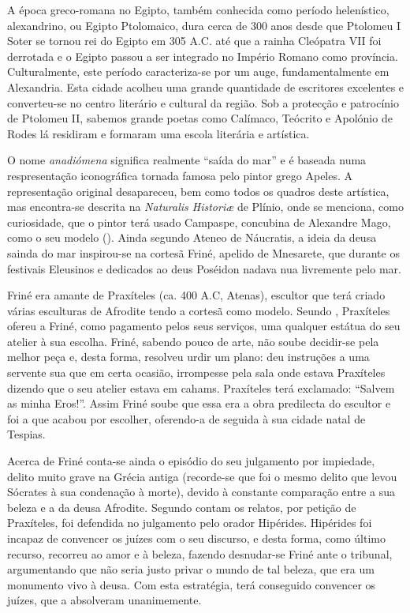 \documentclass{article}
\begin{document}
A época greco-romana no Egipto, também conhecida como período
helenístico, alexandrino, ou Egipto Ptolomaico, dura cerca de 300 anos
desde que Ptolomeu I Soter se tornou rei do Egipto em 305 A.C. até que
a rainha Cleópatra VII foi derrotada e o Egipto passou a ser integrado
no Império Romano como província. Culturalmente, este período
caracteriza-se por um auge, fundamentalmente em Alexandria. Esta
cidade acolheu uma grande quantidade de escritores excelentes e
converteu-se no centro literário e cultural da região. Sob a protecção
e patrocínio de Ptolomeu II, sabemos grande poetas como Calímaco,
Teócrito e Apolónio de Rodes lá residiram e formaram uma escola
literária e artística.

O nome \emph{anadiómena} significa realmente ``saída do mar'' e é
baseada numa respresentação iconográfica tornada famosa pelo pintor
grego Apeles. A representação original desapareceu, bem como todos os
quadros deste artística, mas encontra-se descrita na \emph{Naturalis
  Historiæ} de Plínio, onde se menciona, como curiosidade, que o
pintor terá usado Campaspe, concubina de Alexandre Mago, como o seu
modelo (\cite{wiki-anadiomena}). Ainda segundo Ateneo de Náucratis, a
ideia da deusa sainda do mar inspirou-se na cortesã Friné, apelido de
Mnesarete, que durante os festivais Eleusinos e dedicados ao deus
Poséidon nadava nua livremente pelo mar.

Friné era amante de Praxíteles (ca. 400 A.C, Atenas), escultor que
terá criado várias esculturas de Afrodite tendo a cortesã como
modelo. Seundo \cite{wiki-frine}, Praxíteles ofereu a Friné, como
pagamento pelos seus serviços, uma qualquer estátua do seu atelier à
sua escolha. Friné, sabendo pouco de arte, não soube decidir-se pela
melhor peça e, desta forma, resolveu urdir um plano: deu instruções a
uma servente sua que em certa ocasião, irrompesse pela sala onde
estava Praxíteles dizendo que o seu atelier estava em
cahams. Praxíteles terá exclamado: ``Salvem as minha Eros!''. Assim
Friné soube que essa era a obra predilecta do escultor e foi a que
acabou por escolher, oferendo-a de seguida à sua cidade natal de Tespias.

Acerca de Friné conta-se ainda o episódio do seu julgamento por
impiedade, delito muito grave na Grécia antiga (recorde-se que foi o
mesmo delito que levou Sócrates à sua condenação à morte), devido à
constante comparação entre a sua beleza e a da deusa Afrodite. Segundo
contam os relatos, por petição de Praxíteles, foi defendida no
julgamento pelo orador Hipérides. Hipérides foi incapaz de convencer
os juízes com o seu discurso, e desta forma, como último recurso,
recorreu ao amor e à beleza, fazendo desnudar-se Friné ante o
tribunal, argumentando que não seria justo privar o mundo de tal
beleza, que era um monumento vivo à deusa. Com esta estratégia, terá
conseguido convencer os juízes, que a absolveram unanimemente.
\end{document}
